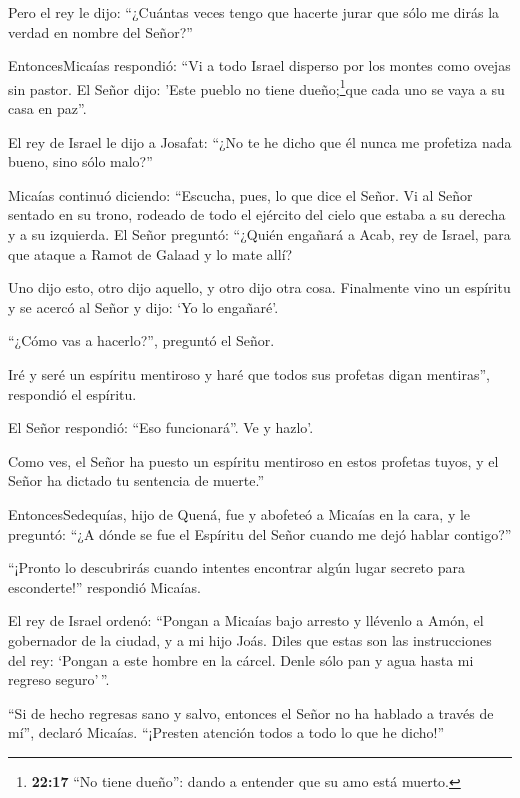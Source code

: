  Pero el rey le dijo: ``¿Cuántas veces tengo que hacerte
jurar que sólo me dirás la verdad en nombre del Señor?''

 EntoncesMicaías respondió: ``Vi a todo Israel disperso por
los montes como ovejas sin pastor. El Señor dijo: 'Este pueblo no tiene
dueño;\footnote{\textbf{22:17} ``No tiene dueño'': dando a entender que
  su amo está muerto.}que cada uno se vaya a su casa en paz''.

 El rey de Israel le dijo a Josafat: ``¿No te he dicho que
él nunca me profetiza nada bueno, sino sólo malo?''

 Micaías continuó diciendo: ``Escucha, pues, lo que dice el
Señor. Vi al Señor sentado en su trono, rodeado de todo el ejército del
cielo que estaba a su derecha y a su izquierda.  El Señor
preguntó: ``¿Quién engañará a Acab, rey de Israel, para que ataque a
Ramot de Galaad y lo mate allí?

Uno dijo esto, otro dijo aquello, y otro dijo otra cosa. 
Finalmente vino un espíritu y se acercó al Señor y dijo: `Yo lo
engañaré'.

 ``¿Cómo vas a hacerlo?'', preguntó el Señor.

Iré y seré un espíritu mentiroso y haré que todos sus profetas digan
mentiras'', respondió el espíritu.

El Señor respondió: ``Eso funcionará''. Ve y hazlo'.

 Como ves, el Señor ha puesto un espíritu mentiroso en
estos profetas tuyos, y el Señor ha dictado tu sentencia de muerte.''

 EntoncesSedequías, hijo de Quená, fue y abofeteó a Micaías
en la cara, y le preguntó: ``¿A dónde se fue el Espíritu del Señor
cuando me dejó hablar contigo?''

 ``¡Pronto lo descubrirás cuando intentes encontrar algún
lugar secreto para esconderte!'' respondió Micaías.

 El rey de Israel ordenó: ``Pongan a Micaías bajo arresto y
llévenlo a Amón, el gobernador de la ciudad, y a mi hijo Joás.
 Diles que estas son las instrucciones del rey: `Pongan a
este hombre en la cárcel. Denle sólo pan y agua hasta mi regreso
seguro'\,''.

 ``Si de hecho regresas sano y salvo, entonces el Señor no
ha hablado a través de mí'', declaró Micaías. ``¡Presten atención todos
a todo lo que he dicho!''

